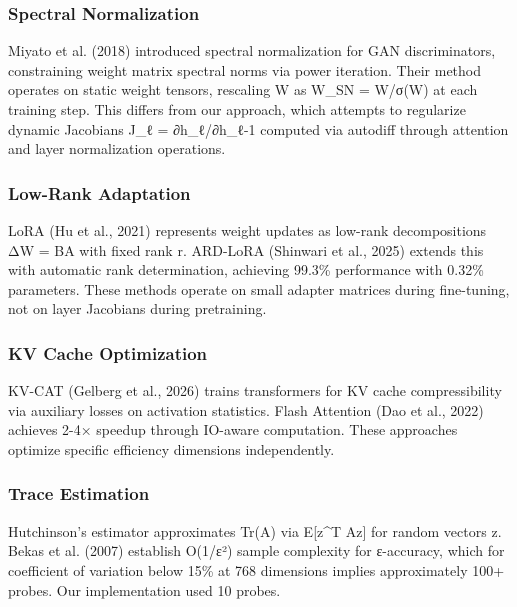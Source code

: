
\subsubsection{Spectral Normalization}

Miyato et al. (2018) introduced spectral normalization for GAN discriminators, constraining weight matrix spectral norms via power iteration. Their method operates on static weight tensors, rescaling W as W_SN = W/σ(W) at each training step. This differs from our approach, which attempts to regularize dynamic Jacobians J_ℓ = ∂h_ℓ/∂h_{ℓ-1} computed via autodiff through attention and layer normalization operations.

\subsubsection{Low-Rank Adaptation}

LoRA (Hu et al., 2021) represents weight updates as low-rank decompositions ΔW = BA with fixed rank r. ARD-LoRA (Shinwari et al., 2025) extends this with automatic rank determination, achieving 99.3\% performance with 0.32\% parameters. These methods operate on small adapter matrices during fine-tuning, not on layer Jacobians during pretraining.

\subsubsection{KV Cache Optimization}

KV-CAT (Gelberg et al., 2026) trains transformers for KV cache compressibility via auxiliary losses on activation statistics. Flash Attention (Dao et al., 2022) achieves 2-4× speedup through IO-aware computation. These approaches optimize specific efficiency dimensions independently.

\subsubsection{Trace Estimation}

Hutchinson's estimator approximates Tr(A) via E[z^T Az] for random vectors z. Bekas et al. (2007) establish O(1/ε²) sample complexity for ε-accuracy, which for coefficient of variation below 15\% at 768 dimensions implies approximately 100+ probes. Our implementation used 10 probes.
